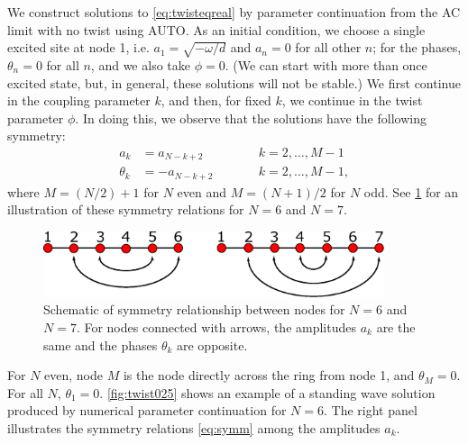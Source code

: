 \documentclass[12pt]{article}
\def\noi{\noindent}
\begin{document}
We construct solutions to \cref{eq:twisteqreal} by parameter continuation from the AC limit with no twist using AUTO. As an initial condition, we choose a single excited site at node 1, i.e. $a_1 = \sqrt{-\omega/d}$ and $a_n = 0$ for all other $n$; for the phases, $\theta_n = 0$ for all $n$, and we also take $\phi = 0$. (We can start with more than once excited state, but, in general, these solutions will not be stable.) We first continue in the coupling parameter $k$, and then, for fixed $k$, we continue in the twist parameter $\phi$. In doing this, we observe that the solutions have the following symmetry:
\begin{equation}\label{eq:symm}
\begin{aligned}
a_k &= a_{N-k+2} && \qquad k = 2, \dots, M-1 \\
\theta_k &= -a_{N-k+2} && \qquad k = 2, \dots, M-1,
\end{aligned}
\end{equation}
where $M = (N/2)+1$ for $N$ even and $M = (N+1)/2$ for $N$ odd. See \cref{fig:symmetry1} for an illustration of these symmetry relations for $N = 6$ and $N = 7$. 
\begin{figure}[H]
\begin{center}
\includegraphics[width=10cm]{symmetry1.eps}
\end{center}
\caption{Schematic of symmetry relationship between nodes for $N = 6$ and $N=7$. For nodes connected with arrows, the amplitudes $a_k$ are the same and the phases $\theta_k$ are opposite.}
\label{fig:symmetry1}
\end{figure}
\noi For $N$ even, node $M$ is the node directly across the ring from node 1, and $\theta_M = 0$. For all $N$, $\theta_1 = 0$. \cref{fig:twist025} shows an example of a standing wave solution produced by numerical parameter continuation for $N = 6$. The right panel illustrates the symmetry relations \cref{eq:symm} among the amplitudes $a_k$.
\end{document}
